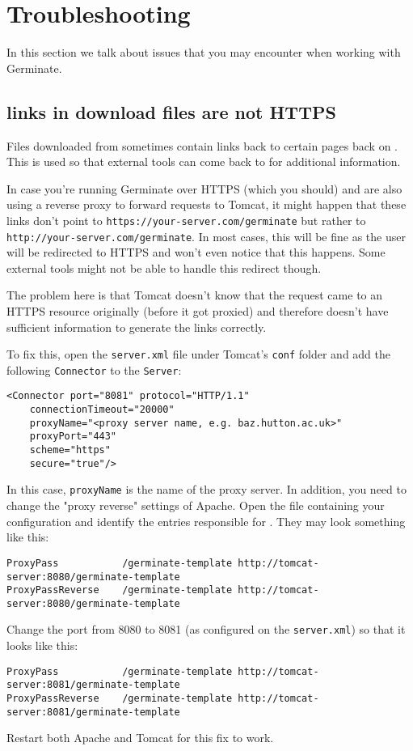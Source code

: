 \section{Troubleshooting}
\label{sec:troubleshooting}
In this section we talk about issues that you may encounter when working with Germinate.

\subsection{{\germinate} links in download files are not HTTPS}
Files downloaded from {\germinate} sometimes contain links back to certain pages back on {\germinate}. This is used so that external tools can come back to {\germinate} for additional information.

In case you're running Germinate over HTTPS (which you should) and are also using a reverse proxy to forward requests to Tomcat, it might happen that these links don't point to \texttt{https://your-server.com/germinate} but rather to \texttt{http://your-server.com/germinate}. In most cases, this will be fine as the user will be redirected to HTTPS and won't even notice that this happens. Some external tools might not be able to handle this redirect though.

The problem here is that Tomcat doesn't know that the request came to an HTTPS resource originally (before it got proxied) and {\germinate} therefore doesn't have sufficient information to generate the links correctly.

To fix this, open the \texttt{server.xml} file under Tomcat's \texttt{conf} folder and add the following \texttt{Connector} to the \texttt{Server}:
\begin{lstlisting}[style=Xml]
<Connector port="8081" protocol="HTTP/1.1"
	connectionTimeout="20000"
	proxyName="<proxy server name, e.g. baz.hutton.ac.uk>"
	proxyPort="443"
	scheme="https"
	secure="true"/>
\end{lstlisting}

\noindent
In this case, \texttt{proxyName} is the name of the proxy server. In addition, you need to change the "proxy reverse" settings of Apache. Open the file containing your configuration and identify the entries responsible for {\germinate}. They may look something like this:

\begin{lstlisting}[style=Proxy]
ProxyPass			/germinate-template http://tomcat-server:8080/germinate-template
ProxyPassReverse	/germinate-template http://tomcat-server:8080/germinate-template
\end{lstlisting}

\noindent
Change the port from 8080 to 8081 (as configured on the \texttt{server.xml}) so that it looks like this:

\begin{lstlisting}[style=Proxy]
ProxyPass			/germinate-template http://tomcat-server:8081/germinate-template
ProxyPassReverse	/germinate-template http://tomcat-server:8081/germinate-template
\end{lstlisting}

\noindent
Restart both Apache and Tomcat for this fix to work.